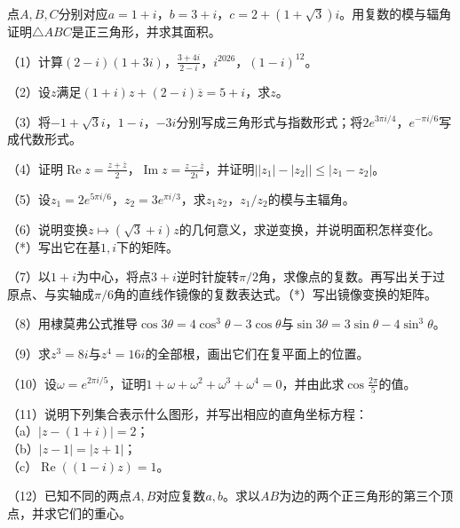 \begin{example}
点\(A , B , C\)分别对应\(a = 1 + i\)，\(b = 3 + i\)，\(c = 2 + \left( 1 + \sqrt{3} \right) i\)。用复数的模与辐角证明\(\triangle A B C\)是正三角形，并求其面积。
\end{example}
\begin{exercise}
（1）计算\(\left( 2 - i \right) \left( 1 + 3 i \right)\)，\(\frac{3 + 4 i}{2 - i}\)，\(i^{2026}\)，\(\left( 1 - i \right)^{12}\)。

（2）设\(z\)满足\(\left( 1 + i \right) z + \left( 2 - i \right) \overline{z} = 5 + i\)，求\(z\)。

（3）将\(- 1 + \sqrt{3} i\)，\(1 - i\)，\(- 3 i\)分别写成三角形式与指数形式；将\(2 e^{3 \pi i / 4}\)，\(e^{- \pi i / 6}\)写成代数形式。

（4）证明\(\operatorname{Re} z = \frac{z + \overline{z}}{2}\)，\(\operatorname{Im} z = \frac{z - \overline{z}}{2 i}\)，并证明\(\left| \left| z_{1} \right| - \left| z_{2} \right| \right| \le \left| z_{1} - z_{2} \right|\)。

（5）设\(z_{1} = 2 e^{5 \pi i / 6}\)，\(z_{2} = 3 e^{\pi i / 3}\)，求\(z_{1} z_{2}\)，\(z_{1} / z_{2}\)的模与主辐角。

（6）说明变换\(z \mapsto \left( \sqrt{3} + i \right) z\)的几何意义，求逆变换，并说明面积怎样变化。\mbox{（*）写出}它在基\(1 , i\)下的矩阵。

（7）以\(1 + i\)为中心，将点\(3 + i\)逆时针旋转\(\pi / 2\)角，求像点的复数。再写出关于过原点、与实轴成\(\pi / 6\)角的直线作镜像的复数表达式。\mbox{（*）写出}镜像变换的矩阵。

（8）用棣莫弗公式推导\(\cos 3 \theta = 4 \cos^{3} \theta - 3 \cos \theta\)与\(\sin 3 \theta = 3 \sin \theta - 4 \sin^{3} \theta\)。

（9）求\(z^{3} = 8 i\)与\(z^{4} = 16 i\)的全部根，画出它们在复平面上的位置。

（10）设\(\omega = e^{2 \pi i / 5}\)，证明\(1 + \omega + \omega^{2} + \omega^{3} + \omega^{4} = 0\)，并由此求\(\cos \frac{2 \pi}{5}\)的值。

（11）说明下列集合表示什么图形，并写出相应的直角坐标方程：\\
（a）\(\left| z - \left( 1 + i \right) \right| = 2\)；\\
（b）\(\left| z - 1 \right| = \left| z + 1 \right|\)；\\
（c）\(\operatorname{Re} \left( \left( 1 - i \right) z \right) = 1\)。

（12）已知不同的两点\(A , B\)对应复数\(a , b\)。求以\(A B\)为边的两个正三角形的第三个顶点，并求它们的重心。


\end{exercise}
